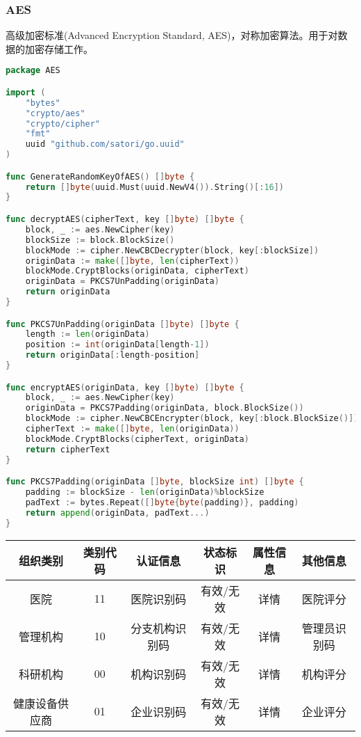 \documentclass[UTF8]{ctexart}
\begin{document}
    \subsubsection{AES}
    \par
    高级加密标准(Advanced Encryption Standard, AES)，对称加密算法。用于对数据的加密存储工作。
    \begin{lstlisting}[language=Go]
package AES

import (
	"bytes"
	"crypto/aes"
	"crypto/cipher"
	"fmt"
	uuid "github.com/satori/go.uuid"
)

func GenerateRandomKeyOfAES() []byte {
	return []byte(uuid.Must(uuid.NewV4()).String()[:16])
}

func decryptAES(cipherText, key []byte) []byte {
	block, _ := aes.NewCipher(key)
	blockSize := block.BlockSize()
	blockMode := cipher.NewCBCDecrypter(block, key[:blockSize])
	originData := make([]byte, len(cipherText))
	blockMode.CryptBlocks(originData, cipherText)
	originData = PKCS7UnPadding(originData)
	return originData
}

func PKCS7UnPadding(originData []byte) []byte {
	length := len(originData)
	position := int(originData[length-1])
	return originData[:length-position]
}

func encryptAES(originData, key []byte) []byte {
	block, _ := aes.NewCipher(key)
	originData = PKCS7Padding(originData, block.BlockSize())
	blockMode := cipher.NewCBCEncrypter(block, key[:block.BlockSize()])
	cipherText := make([]byte, len(originData))
	blockMode.CryptBlocks(cipherText, originData)
	return cipherText
}

func PKCS7Padding(originData []byte, blockSize int) []byte {
	padding := blockSize - len(originData)%blockSize
	padText := bytes.Repeat([]byte{byte(padding)}, padding)
	return append(originData, padText...)
}
    \end{lstlisting}

    \begin{center}
    \begin{tabular}{cccccc}
        \hline
        组织类别& 类别代码& 认证信息& 状态标识& 属性信息& 其他信息\\
        \hline
        医院& 11& 医院识别码& 有效/无效& 详情& 医院评分\\
        管理机构& 10& 分支机构识别码& 有效/无效& 详情& 管理员识别码\\
        科研机构& 00& 机构识别码& 有效/无效& 详情& 机构评分\\
        健康设备供应商& 01& 企业识别码& 有效/无效& 详情& 企业评分\\
        \hline
    \end{tabular}
    \end{center}
    
\end{document}
